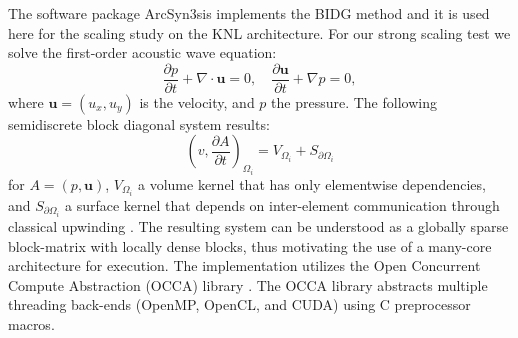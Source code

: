 The software package ArcSyn3sis implements the BIDG method and it is used here
for the scaling study on the KNL architecture. For our strong scaling test we solve the first-order acoustic wave equation:
\begin{equation}
  \label{awe}
  \frac{\partial p}{\partial t} + \nabla\cdot \boldsymbol{u} = 0, \quad
  \frac{\partial\boldsymbol{u}}{\partial t} + \nabla p = 0,
\end{equation}
where $\boldsymbol{u}=(u_x,u_y)$ is the velocity, and $p$ the pressure. The following semidiscrete block diagonal system results:
\[
  \left( v, \frac{ \partial A}{\partial t} \right)_{\Omega_{i}} =
  V_{\Omega_{i}}+S_{\partial\Omega_{i}}
\]
for $A = (p,\boldsymbol{u})$, $V_{\Omega_{i}}$ a volume kernel that has only
elementwise dependencies, and $S_{\partial\Omega_{i}}$ a surface kernel that
depends on inter-element communication through classical upwinding
\cite{Michoski2014898}.  The resulting system can be understood as a globally sparse block-matrix with locally dense blocks, thus motivating the use of a many-core architecture for execution.  The implementation utilizes the Open Concurrent Compute Abstraction (OCCA) library \cite{MedinaPress}.  The OCCA library abstracts multiple threading back-ends (OpenMP, OpenCL, and CUDA) using C preprocessor macros.



